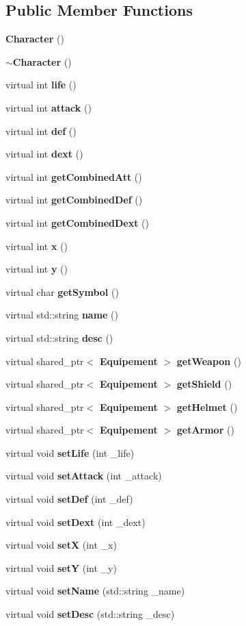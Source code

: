 \subsection*{Public Member Functions}
\begin{DoxyCompactItemize}
\item 
{\bf Character} ()
\item 
{\bf $\sim$\-Character} ()
\item 
virtual int {\bf life} ()
\item 
virtual int {\bf attack} ()
\item 
virtual int {\bf def} ()
\item 
virtual int {\bf dext} ()
\item 
virtual int {\bf get\-Combined\-Att} ()
\item 
virtual int {\bf get\-Combined\-Def} ()
\item 
virtual int {\bf get\-Combined\-Dext} ()
\item 
virtual int {\bf x} ()
\item 
virtual int {\bf y} ()
\item 
virtual char {\bf get\-Symbol} ()
\item 
virtual std\-::string {\bf name} ()
\item 
virtual std\-::string {\bf desc} ()
\item 
virtual shared\-\_\-ptr$<$ {\bf Equipement} $>$ {\bf get\-Weapon} ()
\item 
virtual shared\-\_\-ptr$<$ {\bf Equipement} $>$ {\bf get\-Shield} ()
\item 
virtual shared\-\_\-ptr$<$ {\bf Equipement} $>$ {\bf get\-Helmet} ()
\item 
virtual shared\-\_\-ptr$<$ {\bf Equipement} $>$ {\bf get\-Armor} ()
\item 
virtual void {\bf set\-Life} (int \-\_\-life)
\item 
virtual void {\bf set\-Attack} (int \-\_\-attack)
\item 
virtual void {\bf set\-Def} (int \-\_\-def)
\item 
virtual void {\bf set\-Dext} (int \-\_\-dext)
\item 
virtual void {\bf set\-X} (int \-\_\-x)
\item 
virtual void {\bf set\-Y} (int \-\_\-y)
\item 
virtual void {\bf set\-Name} (std\-::string \-\_\-name)
\item 
virtual void {\bf set\-Desc} (std\-::string \-\_\-desc)
\item 

\end{DoxyCompactItemize}
